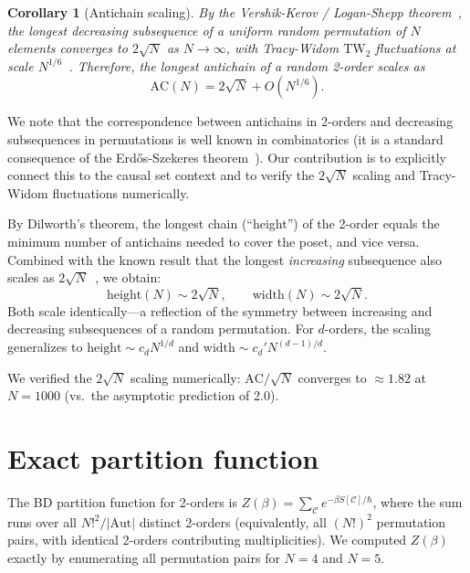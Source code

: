 \documentclass[aps,prd,twocolumn,superscriptaddress,nofootinbib]{revtex4-2}
\newtheorem{corollary}[theorem]{Corollary}
\begin{document}
\begin{corollary}[Antichain scaling]
By the Vershik-Kerov / Logan-Shepp theorem~\cite{vershik1977,logan1977}, the longest decreasing subsequence of a uniform random permutation of $N$ elements converges to $2\sqrt{N}$ as $N \to \infty$, with Tracy-Widom $\mathrm{TW}_2$ fluctuations at scale $N^{1/6}$~\cite{baik1999}. Therefore, the longest antichain of a random 2-order scales as
\begin{equation}
\mathrm{AC}(N) = 2\sqrt{N} + O(N^{1/6}).
\end{equation}
\end{corollary}

We note that the correspondence between antichains in 2-orders and decreasing subsequences in permutations is well known in combinatorics (it is a standard consequence of the Erd\H{o}s-Szekeres theorem~\cite{erdos1935}). Our contribution is to explicitly connect this to the causal set context and to verify the $2\sqrt{N}$ scaling and Tracy-Widom fluctuations numerically.

By Dilworth's theorem, the longest chain (``height'') of the 2-order equals the minimum number of antichains needed to cover the poset, and vice versa. Combined with the known result that the longest \emph{increasing} subsequence also scales as $2\sqrt{N}$~\cite{vershik1977}, we obtain:
\begin{equation}
\mathrm{height}(N) \sim 2\sqrt{N}, \qquad \mathrm{width}(N) \sim 2\sqrt{N}.
\end{equation}
Both scale identically---a reflection of the symmetry between increasing and decreasing subsequences of a random permutation. For $d$-orders, the scaling generalizes to $\mathrm{height} \sim c_d N^{1/d}$ and $\mathrm{width} \sim c_d' N^{(d-1)/d}$.

We verified the $2\sqrt{N}$ scaling numerically: $\mathrm{AC}/\sqrt{N}$ converges to $\approx 1.82$ at $N = 1000$ (vs.\ the asymptotic prediction of 2.0).

\section{Exact partition function}

The BD partition function for 2-orders is $Z(\beta) = \sum_{\mathcal{C}} e^{-\beta S[\mathcal{C}]/\hbar}$, where the sum runs over all $N!^2 / |\mathrm{Aut}|$ distinct 2-orders (equivalently, all $(N!)^2$ permutation pairs, with identical 2-orders contributing multiplicities). We computed $Z(\beta)$ exactly by enumerating all permutation pairs for $N = 4$ and $N = 5$.
\end{document}
